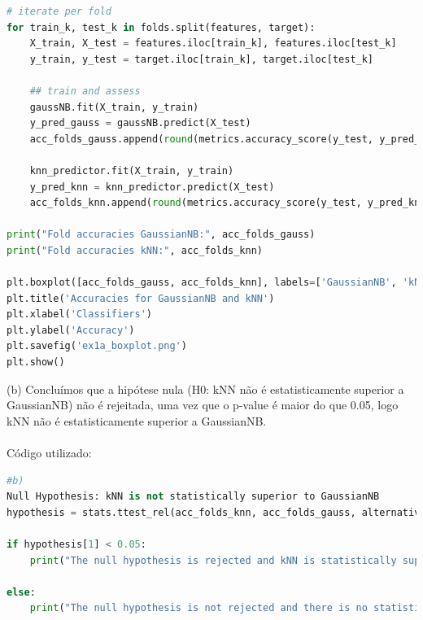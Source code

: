 \documentclass[a4paper,12pt]{article} %
\begin{document}
\begin{enumerate}
\begin{lstlisting}[language=Python]
# iterate per fold
for train_k, test_k in folds.split(features, target):
    X_train, X_test = features.iloc[train_k], features.iloc[test_k]
    y_train, y_test = target.iloc[train_k], target.iloc[test_k]
    
    ## train and assess
    gaussNB.fit(X_train, y_train)
    y_pred_gauss = gaussNB.predict(X_test)
    acc_folds_gauss.append(round(metrics.accuracy_score(y_test, y_pred_gauss),2))
    
    knn_predictor.fit(X_train, y_train)
    y_pred_knn = knn_predictor.predict(X_test)
    acc_folds_knn.append(round(metrics.accuracy_score(y_test, y_pred_knn),2))

print("Fold accuracies GaussianNB:", acc_folds_gauss)
print("Fold accuracies kNN:", acc_folds_knn)

plt.boxplot([acc_folds_gauss, acc_folds_knn], labels=['GaussianNB', 'kNN'])
plt.title('Accuracies for GaussianNB and kNN')
plt.xlabel('Classifiers')
plt.ylabel('Accuracy')
plt.savefig('ex1a_boxplot.png')
plt.show()
        \end{lstlisting}

    
    (b) Concluímos que a hipótese nula (H0: kNN não é estatisticamente superior a GaussianNB) não é rejeitada, uma vez que o p-value é maior do que 0.05, logo kNN não é estatisticamente superior a GaussianNB.
    \\ \\
    Código utilizado:
    \begin{lstlisting}[language=Python]
#b) 
Null Hypothesis: kNN is not statistically superior to GaussianNB
hypothesis = stats.ttest_rel(acc_folds_knn, acc_folds_gauss, alternative='greater')

if hypothesis[1] < 0.05:
    print("The null hypothesis is rejected and kNN is statistically superior to GaussianNB")
    
else:
    print("The null hypothesis is not rejected and there is no statistical superiority between kNN and GaussianNB")
    \end{lstlisting}


\end{enumerate}
\end{document}
